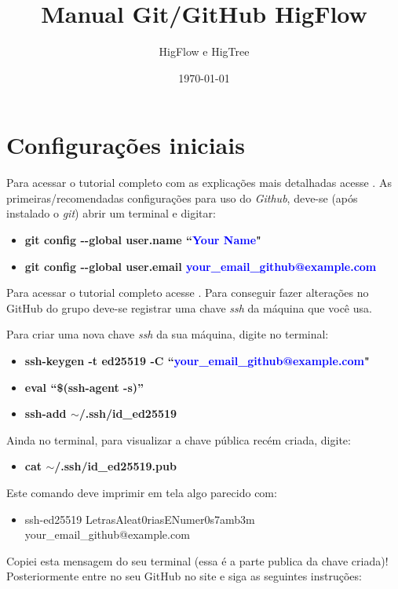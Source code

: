 \documentclass[12pt]{article}
\begin{document}
\title{Manual Git/GitHub HigFlow}
\author{HigFlow e HigTree}
\date{\today}
\maketitle

\section{Configurações iniciais}\label{sec:configuracoes}
Para acessar o tutorial completo com as explicações mais detalhadas acesse \cite{site1}. As primeiras/recomendadas configurações para uso do \textit{Github}, deve-se (após instalado o \textit{git}) abrir um terminal e digitar:
\begin{itemize}
	\item \textbf{git config  -\hspace{0.5mm}-global user.name ``\textcolor{blue}{Your Name}"}
	\item \textbf{git config -\hspace{0.5mm}-global user.email \textcolor{blue}{your\_email\_github@example.com}}
\end{itemize}

Para acessar o tutorial completo acesse \cite{site2}. Para conseguir fazer alterações no GitHub do grupo deve-se registrar uma chave \textit{ssh} da máquina que você usa. 


Para criar uma nova chave \textit{ssh} da sua máquina, digite no terminal:
\begin{itemize}
	\item \textbf{ssh-keygen -t ed25519 -C ``\textcolor{blue}{your\_email\_github@example.com}"}
	\item \textbf{eval ``\$(ssh-agent -s)''}
	\item \textbf{ssh-add $\sim$/.ssh/id\_ed25519}
\end{itemize}
Ainda no terminal, para visualizar a chave pública recém criada, digite:
\begin{itemize}
	\item \textbf{cat $\sim$/.ssh/id\_ed25519.pub}
\end{itemize}
Este comando deve imprimir em tela algo parecido com:
\begin{itemize}
	\item[] ssh-ed25519 LetrasAleat0riasENumer0s7amb3m your\_email\_github@example.com
\end{itemize}
Copiei esta mensagem do seu terminal (essa é a parte publica da chave criada)! Posteriormente entre no seu GitHub no site e siga as seguintes instruções:
\end{document}
